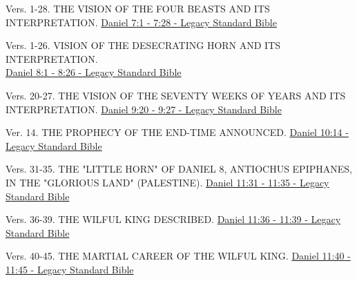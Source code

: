 \documentclass[
  ignorenonframetext,
]{beamer}
\begin{document}
\begin{frame}{7}
\label{section-105}
\begin{block}{Vers. 1-28. THE VISION OF THE FOUR BEASTS AND ITS
INTERPRETATION.}
\label{vers.-1-28.-the-vision-of-the-four-beasts-and-its-interpretation.}
\href{https://read.lsbible.org/?q=dan7\%3A1-28}{Daniel 7:1 - 7:28 -
Legacy Standard Bible}
\end{block}
\end{frame}

\begin{frame}{8}
\label{section-106}
Vers. 1-26. VISION OF THE DESECRATING HORN AND ITS INTERPRETATION.\\
\href{https://read.lsbible.org/?q=dan8\%3A1-26}{Daniel 8:1 - 8:26 -
Legacy Standard Bible}
\end{frame}

\begin{frame}{9}
\label{section-107}
\begin{block}{Vers. 20-27. THE VISION OF THE SEVENTY WEEKS OF YEARS AND
ITS INTERPRETATION.}
\label{vers.-20-27.-the-vision-of-the-seventy-weeks-of-years-and-its-interpretation.}
\href{https://read.lsbible.org/?q=dan9\%3A20-27}{Daniel 9:20 - 9:27 -
Legacy Standard Bible}
\end{block}
\end{frame}

\begin{frame}{10}
\label{section-108}
\begin{block}{Ver. 14. THE PROPHECY OF THE END-TIME ANNOUNCED.}
\label{ver.-14.-the-prophecy-of-the-end-time-announced.}
\href{https://read.lsbible.org/?q=dan10\%3A14}{Daniel 10:14 - Legacy
Standard Bible}
\end{block}
\end{frame}

\begin{frame}{11}
\label{section-109}
\begin{block}{Vers. 31-35. THE "LITTLE HORN" OF DANIEL 8, ANTIOCHUS
EPIPHANES, IN THE "GLORIOUS LAND" (PALESTINE).}
\label{vers.-31-35.-the-little-horn-of-daniel-8-antiochus-epiphanes-in-the-glorious-land-palestine.}
\href{https://read.lsbible.org/?q=dan11\%3A31-35}{Daniel 11:31 - 11:35 -
Legacy Standard Bible}
\end{block}

\begin{block}{Vers. 36-39. THE WILFUL KING DESCRIBED.}
\label{vers.-36-39.-the-wilful-king-described.}
\href{https://read.lsbible.org/?q=dan11\%3A36-39}{Daniel 11:36 - 11:39 -
Legacy Standard Bible}
\end{block}

\begin{block}{Vers. 40-45. THE MARTIAL CAREER OF THE WILFUL KING.}
\label{vers.-40-45.-the-martial-career-of-the-wilful-king.}
\href{https://read.lsbible.org/?q=dan11\%3A40-45}{Daniel 11:40 - 11:45 -
Legacy Standard Bible}
\end{block}
\end{frame}
\end{document}
